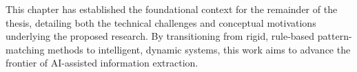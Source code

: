 \vspace{1em}

This chapter has established the foundational context for the remainder of the thesis, detailing both the technical challenges and conceptual motivations underlying the proposed research. By transitioning from rigid, rule-based pattern-matching methods to intelligent, dynamic systems, this work aims to advance the frontier of AI-assisted information extraction.















